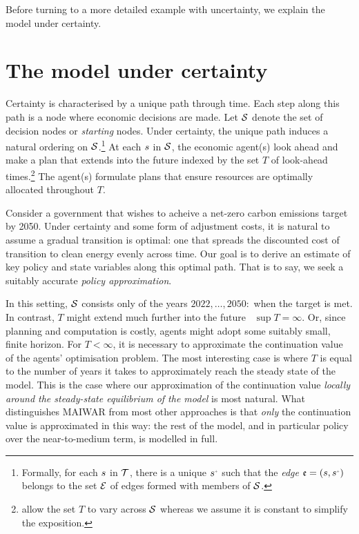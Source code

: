 \documentclass[12pt,a4paper,twoside, draft]{article}
\begin{document}
Before turning to a more detailed example with uncertainty, we explain the
model under certainty.
\section{The model under certainty}\label{sec-certainty}
Certainty is characterised by a unique path through time.
Each step along this path is a node where economic decisions are made.
Let $\mathcal{S}$ denote the set of decision nodes or \emph{starting} nodes.
Under certainty, the unique path induces a natural ordering on
$\mathcal{S}$.\footnote{
  Formally, for each ${s}$ in $\mathcal T$, there is a unique
  $\node^{\mplus}$ such that the \emph{edge} $\edge = (\node, \node^{\mplus})$
  belongs to the set $\mathcal{E}$ of edges formed with members of $\mathcal{S}$.
}
At each ${s}$ in $\mathcal{S}$, the economic agent(s) look ahead and make a plan
that extends into the future indexed by the set $T$ of look-ahead
times.\footnote{\citet{CJ} allow the set $T$ to vary across $\mathcal{S}$ whereas we
assume it is constant to simplify the exposition.}
The agent(s) formulate plans that ensure resources are optimally allocated
throughout $T$.

\begin{example}
  Consider a government that wishes to acheive a net-zero carbon emissions
  target by 2050.
  Under certainty and some form of adjustment costs, it is natural to
  assume a gradual transition is optimal: one that spreads the discounted cost
  of transition to clean energy evenly across time.
  Our goal is to derive an estimate of key policy and state variables along
  this optimal path.
  That is to say, we seek a suitably accurate \emph{policy approximation}.
  
  In this setting, $\mathcal{S}$ consists only of the years  $2022, \dots, 2050 :$
  when the target is met.
  In contrast, $T$ might extend much further into the future \eg\
  $\sup T = \infty$.
  Or, since planning and computation is costly, agents might adopt some
  suitably small, finite horizon.
  For $T < \infty$, it is necessary to approximate the continuation value of
  the agents' optimisation problem.
  The most interesting case is where $T$ is equal to the number of years it
  takes to approximately reach the steady state of the model.
  This is the case where our approximation of the continuation
  value \emph{locally around the steady-state equilibrium of the model} is most
  natural.
  What distinguishes MAIWAR from most other approaches is that \emph{only} the
  continuation value is approximated in this way: the rest of the model, and in
  particular policy over the near-to-medium term, is modelled in full.
\end{example}
\end{document}
